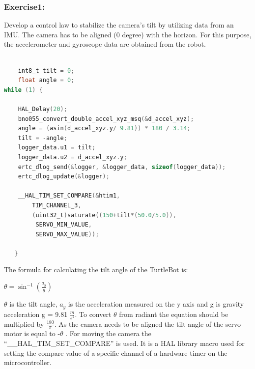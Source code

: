 \documentclass[english]{article}
\begin{document}
\subsubsection{Exercise1:}
Develop a control law to stabilize the camera’s tilt by utilizing data from an IMU. \newline
The camera has to be aligned (0 degree) with the horizon. For
this purpose, the accelerometer and gyroscope data are obtained from the robot.
\begin{lstlisting}[language=C, caption={C code using listings}, label={lst:cameraTilt} ]

    int8_t tilt = 0; 
    float angle = 0; 
while (1) { 

    HAL_Delay(20); 
    bno055_convert_double_accel_xyz_msq(&d_accel_xyz); 
    angle = (asin(d_accel_xyz.y/ 9.81)) * 180 / 3.14; 
    tilt = -angle; 
    logger_data.u1 = tilt; 
    logger_data.u2 = d_accel_xyz.y; 
    ertc_dlog_send(&logger, &logger_data, sizeof(logger_data)); 
    ertc_dlog_update(&logger); 

    __HAL_TIM_SET_COMPARE(&htim1,
        TIM_CHANNEL_3,
        (uint32_t)saturate((150+tilt*(50.0/5.0)),
         SERVO_MIN_VALUE, 
         SERVO_MAX_VALUE));  

   } 
\end{lstlisting}
\newpage
The formula for calculating the tilt angle of the TurtleBot is:\\ 
\begin{center}
    \textbf{$\theta = \sin^{-1}\left(\frac{a_y}{g}\right)$} \\
\end{center}
 $\theta$ is the tilt angle, ${a_y}$ is the acceleration measured on
  the y axis and g is gravity acceleration g = 9.81 $\frac{m}{s^{2}}$.
To convert $\theta$ from radiant the equation should be multiplied by $\frac{180}{\pi}$.
As the camera needs to be aligned the tilt angle of the servo motor is equal to -$\theta$ .\newline
For moving the camera the “\_\_HAL\_TIM\_SET\_COMPARE” is used. It is a HAL library macro
 used for setting the compare value of a specific channel of a hardware timer on the microcontroller. \newline
\end{document}
